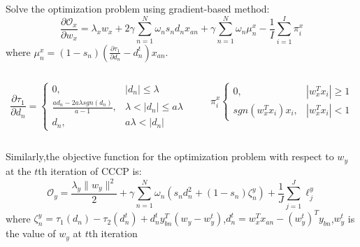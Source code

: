 \documentclass{beamer}
\begin{document}
\begin{CJK*}{UTF8}{gbsn}
\begin{frame}[allowframebreaks]
Solve the optimization problem using gradient-based method:
\begin{displaymath}
\frac{\partial\mathcal{O}_x}{\partial w_x}=\lambda_xw_x+2\gamma\sum_{n=1}^N\omega_ns_nd_nx_{an}+\gamma\sum_{n=1}^N\omega_n\mu_n^x-\frac{1}{I}\sum_{i=1}^I\pi_i^x
\end{displaymath}
where $\mu_n^x=(1-s_n)(\frac{\partial\tau_1}{\partial d_n}-d_n^t)x_{an}$.
\begin{columns}
\begin{column}{0.59\textwidth}
\begin{displaymath}
\frac{\partial\tau_1}{\partial d_n}=
\begin{cases}
0,& |d_n|\leq\lambda \\
\frac{ad_n-2a\lambda sgn(d_n)}{a-1},& \lambda<|d_n|\leq a\lambda \\
d_n,& a\lambda<|d_n|
\end{cases}
\end{displaymath}
\end{column}
\begin{column}{0.42\textwidth}
\begin{displaymath}
\pi_i^x
\begin{cases}
0,& |w_x^Tx_i|\geq 1 \\
sgn(w_x^Tx_i)x_i,& |w_x^Tx_i|<1
\end{cases}
\end{displaymath}
\end{column}
\end{columns}

Similarly,the objective function for the optimization problem with respect to $w_y$ at the $t$th iteration of CCCP is:
\begin{displaymath}
\mathcal{O}_y=\frac{\lambda_y\|w_y\|^2}{2}+\gamma\sum_{n=1}^N\omega_n(s_nd_n^2+(1-s_n)\zeta_n^y)+\frac{1}{J}\sum_{j=1}^J\ell_j^y
\end{displaymath}
where $\zeta_n^y=\tau_1(d_n)-\tau_2(d_n^t)+d_n^ty_{bn}^T(w_y-w_y^t)$,$d_n^t=w_x^Tx_{an}-(w_y^t)^Ty_{bn}$,$w_y^t$ is the value of $w_y$ at $t$th iteration %


\end{frame}
\end{CJK*}
\end{document}

